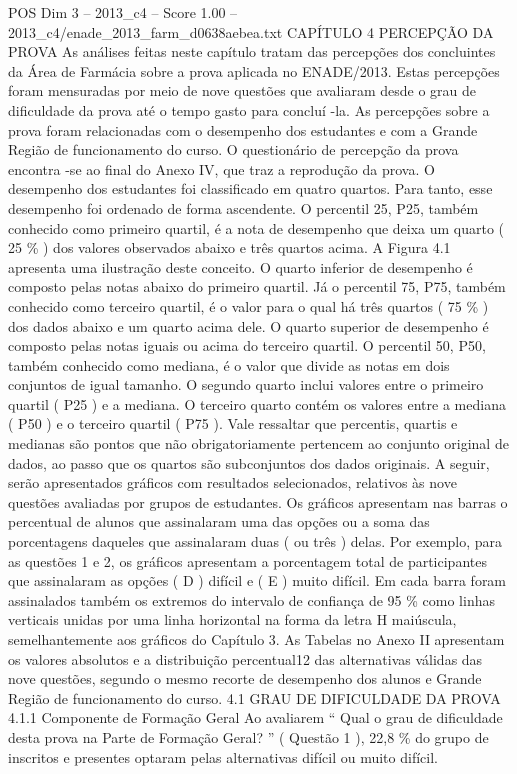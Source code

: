 \begin{textsample}{POS Dim 3 – 2013\_c4 – Score 1.00 – 2013\_c4/enade\_2013\_farm\_d0638aebea.txt}  \label{ex:f3_pos_165}
CAPÍTULO 4 PERCEPÇÃO DA PROVA As análises feitas neste capítulo tratam das percepções dos concluintes da Área de Farmácia sobre a prova aplicada no ENADE/2013.
Estas percepções foram mensuradas por meio de nove questões que avaliaram desde o grau de dificuldade da prova até o tempo gasto para concluí -la.
As percepções sobre a prova foram relacionadas com o desempenho dos estudantes e com a Grande Região de funcionamento do curso.
O questionário de percepção da prova encontra -se ao final do Anexo IV, que traz a reprodução da prova.
O desempenho dos estudantes foi classificado em quatro quartos.
Para tanto, esse desempenho foi ordenado de forma ascendente.
O percentil 25, P25, também conhecido como primeiro quartil, é a nota de desempenho que deixa um quarto ( 25 \% ) dos valores observados abaixo e três quartos acima.
A Figura 4.1 apresenta uma ilustração deste conceito.
O quarto inferior de desempenho é composto pelas notas abaixo do primeiro quartil.
Já o percentil 75, P75, também conhecido como terceiro quartil, é o valor para o qual há três quartos ( 75 \% ) dos dados abaixo e um quarto acima dele.
O quarto superior de desempenho é composto pelas notas iguais ou acima do terceiro quartil.
O percentil 50, P50, também conhecido como mediana, é o valor que divide as notas em dois conjuntos de igual tamanho.
O segundo quarto inclui valores entre o primeiro quartil ( P25 ) e a mediana.
O terceiro quarto contém os valores entre a mediana ( P50 ) e o terceiro quartil ( P75 ).
Vale ressaltar que percentis, quartis e medianas são pontos que não obrigatoriamente pertencem ao conjunto original de dados, ao passo que os quartos são subconjuntos dos dados originais.
A seguir, serão apresentados gráficos com resultados selecionados, relativos às nove questões avaliadas por grupos de estudantes.
Os gráficos apresentam nas barras o percentual de alunos que assinalaram uma das opções ou a soma das porcentagens daqueles que assinalaram duas ( ou três ) delas.
Por exemplo, para as questões 1 e 2, os gráficos apresentam a porcentagem total de participantes que assinalaram as opções ( D ) difícil e ( E ) muito difícil.
Em cada barra foram assinalados também os extremos do intervalo de confiança de 95 \% como linhas verticais unidas por uma linha horizontal na forma da letra H maiúscula, semelhantemente aos gráficos do Capítulo 3.
As Tabelas no Anexo II apresentam os valores absolutos e a distribuição percentual12 das alternativas válidas das nove questões, segundo o mesmo recorte de desempenho dos alunos e Grande Região de funcionamento do curso. 4.1 GRAU DE DIFICULDADE DA PROVA 4.1.1 Componente de Formação Geral Ao avaliarem “ Qual o grau de dificuldade desta prova na Parte de Formação Geral? ” ( Questão 1 ), 22,8 \% do grupo de inscritos e presentes optaram pelas alternativas difícil ou muito difícil.

\end{textsample}
